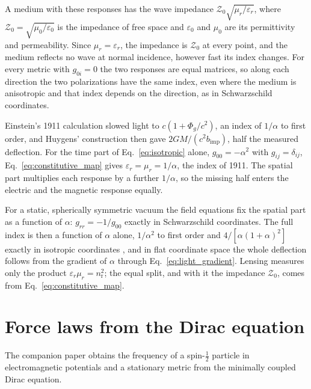 \documentclass[aps,prd,onecolumn,tightenlines,nofootinbib,notitlepage,11pt,floatfix]{revtex4-2}
\theoremstyle{indentedtheorem}
\begin{document}
A medium with these responses has the wave impedance $\mathcal{Z}_0\sqrt{\mu_r/\varepsilon_r}$, where $\mathcal{Z}_0=\sqrt{\mu_0/\varepsilon_0}$ is the impedance of free space and $\varepsilon_0$ and $\mu_0$ are its permittivity and permeability. Since $\mu_r=\varepsilon_r$, the impedance is $\mathcal{Z}_0$ at every point, and the medium reflects no wave at normal incidence, however fast its index changes. For every metric with $g_{0i}=0$ the two responses are equal matrices, so along each direction the two polarizations have the same index, even where the medium is anisotropic and that index depends on the direction, as in Schwarzschild coordinates.

Einstein's 1911 calculation \cite{Einstein1911Influence} slowed light to $c(1+\Phi_g/c^2)$, an index of $1/\alpha$ to first order, and Huygens' construction \citep{Huygens1690Traite} then gave $2GM/(c^2b_\text{imp})$, half the measured deflection. For the time part of Eq.~\eqref{eq:isotropic} alone, $g_{00}=-\alpha^2$ with $g_{ij}=\delta_{ij}$, Eq.~\eqref{eq:constitutive_map} gives $\varepsilon_r=\mu_r=1/\alpha$, the index of 1911. The spatial part multiplies each response by a further $1/\alpha$, so the missing half enters the electric and the magnetic response equally.

For a static, spherically symmetric vacuum the field equations fix the spatial part as a function of $\alpha$: $g_{rr}=-1/g_{00}$ exactly in Schwarzschild coordinates. The full index is then a function of $\alpha$ alone, $1/\alpha^2$ to first order and $4/[\alpha(1+\alpha)^2]$ exactly in isotropic coordinates \citep{MTW1973Gravitation}, and in flat coordinate space the whole deflection follows from the gradient of $\alpha$ through Eq.~\eqref{eq:light_gradient}. Lensing measures only the product $\varepsilon_r\mu_r=n_\text{r}^2$; the equal split, and with it the impedance $\mathcal{Z}_0$, comes from Eq.~\eqref{eq:constitutive_map}.

\section{Force laws from the Dirac equation}
\label{sec:potentials}

The companion paper \citep{HutchisonWavefn2026} obtains the frequency of a spin-$\tfrac{1}{2}$ particle in electromagnetic potentials and a stationary metric from the minimally coupled Dirac equation.
\end{document}
